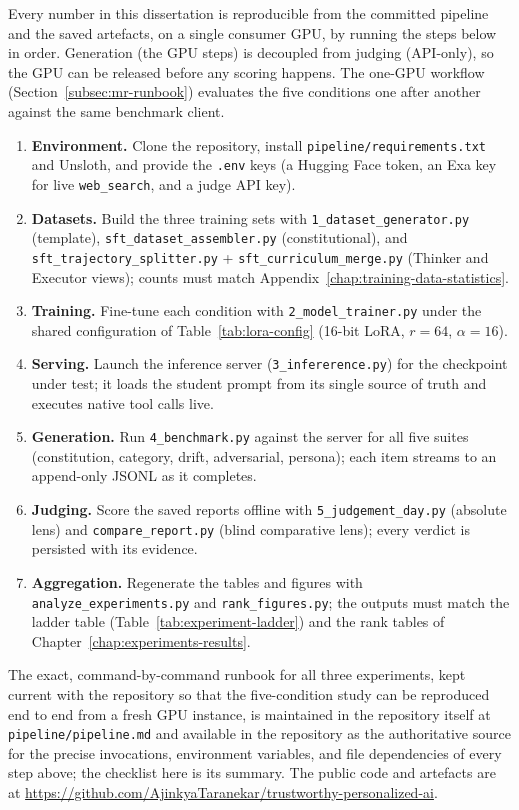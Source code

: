 Every number in this dissertation is reproducible from the committed pipeline and the saved artefacts, on a single consumer GPU, by running the steps below in order. Generation (the GPU steps) is decoupled from judging (API-only), so the GPU can be released before any scoring happens. The one-GPU workflow (Section~\ref{subsec:mr-runbook}) evaluates the five conditions one after another against the same benchmark client.

\begin{enumerate}
  \item \textbf{Environment.} Clone the repository, install \texttt{pipeline/requirements.txt} and Unsloth, and provide the \texttt{.env} keys (a Hugging Face token, an Exa key for live \texttt{web\_search}, and a judge API key).
  \item \textbf{Datasets.} Build the three training sets with \texttt{1\_dataset\_generator.py} (template), \texttt{sft\_dataset\_assembler.py} (constitutional), and \texttt{sft\_trajectory\_splitter.py} + \texttt{sft\_curriculum\_merge.py} (Thinker and Executor views); counts must match Appendix~\ref{chap:training-data-statistics}.
  \item \textbf{Training.} Fine-tune each condition with \texttt{2\_model\_trainer.py} under the shared configuration of Table~\ref{tab:lora-config} (16-bit LoRA, $r{=}64$, $\alpha{=}16$).
  \item \textbf{Serving.} Launch the inference server (\texttt{3\_infererence.py}) for the checkpoint under test; it loads the student prompt from its single source of truth and executes native tool calls live.
  \item \textbf{Generation.} Run \texttt{4\_benchmark.py} against the server for all five suites (constitution, category, drift, adversarial, persona); each item streams to an append-only JSONL as it completes.
  \item \textbf{Judging.} Score the saved reports offline with \texttt{5\_judgement\_day.py} (absolute lens) and \texttt{compare\_report.py} (blind comparative lens); every verdict is persisted with its evidence.
  \item \textbf{Aggregation.} Regenerate the tables and figures with \texttt{analyze\_experiments.py} and \texttt{rank\_figures.py}; the outputs must match the ladder table (Table~\ref{tab:experiment-ladder}) and the rank tables of Chapter~\ref{chap:experiments-results}.
\end{enumerate}

The exact, command-by-command runbook for all three experiments, kept current with the repository so that the five-condition study can be reproduced end to end from a fresh GPU instance, is maintained in the repository itself at \texttt{pipeline/pipeline.md} and available in the repository as the authoritative source for the precise invocations, environment variables, and file dependencies of every step above; the checklist here is its summary. The public code and artefacts are at \url{https://github.com/AjinkyaTaranekar/trustworthy-personalized-ai}.

